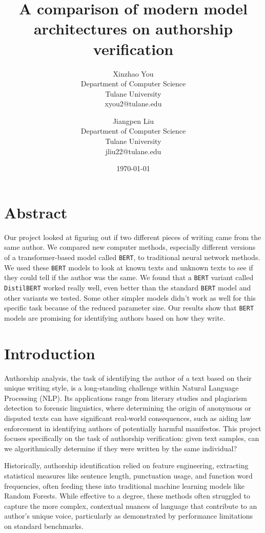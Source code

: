 \documentclass[12pt,a4paper]{article}
\title{\LARGE \textbf{A comparison of modern model architectures on authorship verification}}
\author{
Xinzhao You \\
Department of Computer Science \\
Tulane University \\
xyou2@tulane.edu
\and
Jiangpen Liu \\
Department of Computer Science \\
Tulane University \\
jliu22@tulane.edu
}
\date{\today} %
\begin{document}
\maketitle

\section{Abstract}
Our project looked at figuring out if two different pieces of writing came from the same author. We compared new computer methods, especially different versions of a transformer-based model called \texttt{BERT}, to traditional neural network methods. We used these \texttt{BERT} models to look at known texts and unknown texts to see if they could tell if the author was the same. We found that a \texttt{BERT} variant called \texttt{DistilBERT} worked really well, even better than the standard \texttt{BERT} model and other variants we tested. Some other simpler models didn't work as well for this specific task because of the reduced parameter size. Our results show that \texttt{BERT} models are promising for identifying authors based on how they write.

\section{Introduction}
Authorship analysis, the task of identifying the author of a text based on their unique writing style, is a long-standing challenge within Natural Language Processing (NLP). Its applications range from literary studies and plagiarism detection to forensic linguistics, where determining the origin of anonymous or disputed texts can have significant real-world consequences, such as aiding law enforcement in identifying authors of potentially harmful manifestos. This project focuses specifically on the task of authorship verification: given text samples, can we algorithmically determine if they were written by the same individual? \citep{stamatatos2016review}

Historically, authorship identification relied on feature engineering, extracting statistical measures like sentence length, punctuation usage, and function word frequencies, often feeding these into traditional machine learning models like Random Forests. While effective to a degree, these methods often struggled to capture the more complex, contextual nuances of language that contribute to an author's unique voice, particularly as demonstrated by performance limitations on standard benchmarks.
\end{document}
